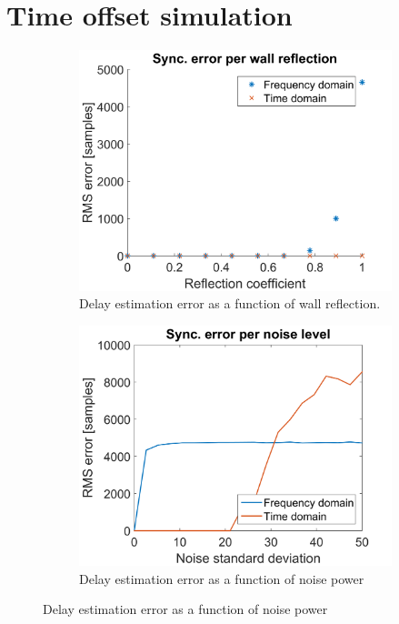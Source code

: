 \documentclass[a4paper, notitlepage]{report}
\begin{document}
\section{Time offset simulation}
\begin{figure}[h!]
\begin{adjustwidth}{-1in}{-1in}
\centering
	\begin{subfigure}{0.5\textwidth}
		\includegraphics[width=\textwidth]{figures/sync-simulation/error-vs-reflection}
		\caption{Delay estimation error as a function of wall reflection.}
		\label{app:sync-simulation-reflection}
	\end{subfigure}
	\begin{subfigure}{0.5\textwidth}
		\includegraphics[width=\textwidth]{figures/sync-simulation/error-vs-noise}
		\caption{Delay estimation error as a function of noise power}
		\label{app:sync-simulation-noise}
	\end{subfigure}
	

\end{adjustwidth}
\end{figure}
\end{document}
